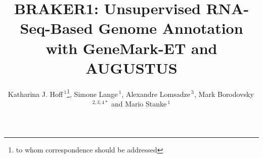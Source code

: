 \documentclass{bioinfo}
\begin{document}

\title[BRAKER1]{BRAKER1: Unsupervised RNA-Seq-Based Genome Annotation with GeneMark-ET and AUGUSTUS}
\author[Hoff \textit{et~al}]{Katharina J. Hoff\,$^{1}$\footnote{to whom correspondence should be addressed}, Simone Lange\,$^{1}$, Alexandre Lomsadze\,$^{3}$, Mark Borodovsky\,$^{2,3,4*}$ and Mario Stanke\,$^1$}
\address{$^{1}$Ernst Moritz Arndt Universit\"{a}t Greifswald, Institute for Mathematics and Computer Science, Walther-Rathenau-Stra\ss{}e 47, 17487 Greifswald, Germany\\
$^{2}$School of Computational Science and Engineering\\
$^{3}$Joint Georgia Tech and Emory University Wallace H Coulter Department of Biomedical Engineering, Atlanta, GA 30332, USA\\
$^{4}$Moscow Institute of Physics and Technology, Dolgoprudny, Moscow Region, Russia}



\maketitle
\end{document}

